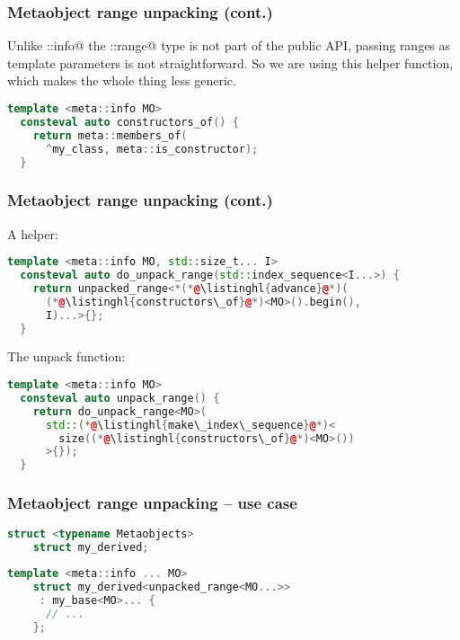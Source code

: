 \documentclass[compress,table,xcolor=table]{beamer}
\begin{document}
\begin{frame}[fragile]
    \frametitle{Metaobject range unpacking (cont.)}
  \Large
  Unlike \verb@meta::info@ the \verb@detail::range@ type is not part of the
    public API, passing ranges as template parameters is not straightforward.
  \vfill
  So we are using this helper function, which makes the whole thing less generic.
    \begin{lstlisting}[language=c++]
  template <meta::info MO>
  consteval auto constructors_of() {
    return meta::members_of(
      ^my_class, meta::is_constructor);
  }
    \end{lstlisting}
\end{frame}
\begin{frame}[fragile]
\frametitle{Metaobject range unpacking (cont.)}
	\large
	A helper:
    \begin{lstlisting}[language=c++]
  template <meta::info MO, std::size_t... I>
  consteval auto do_unpack_range(std::index_sequence<I...>) {
    return unpacked_range<*(*@\listinghl{advance}@*)(
      (*@\listinghl{constructors\_of}@*)<MO>().begin(),
      I)...>{};
  }
    \end{lstlisting}
    \vfill
	The unpack function:
    \begin{lstlisting}[language=c++]
  template <meta::info MO>
  consteval auto unpack_range() {
    return do_unpack_range<MO>(
      std::(*@\listinghl{make\_index\_sequence}@*)<
        size((*@\listinghl{constructors\_of}@*)<MO>())
      >{});
  }
    \end{lstlisting}
\end{frame}
\begin{frame}[fragile]
\frametitle{Metaobject range unpacking -- use case}
    \begin{lstlisting}[language=c++]
	struct <typename Metaobjects>
	struct my_derived;
    \end{lstlisting}

    \begin{lstlisting}[language=c++]
	template <meta::info ... MO>
	struct my_derived<unpacked_range<MO...>>
	 : my_base<MO>... {
      // ...
	};
    \end{lstlisting}
\end{frame}
\begin{frame}
    \Huge
    \vfill
    \LARGE
\end{frame}
\end{document}
